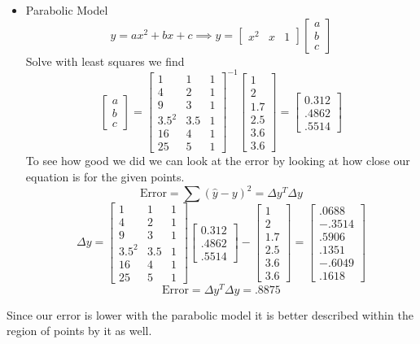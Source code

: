 \documentclass{article}
\begin{document}
\begin{itemize}
\item Parabolic Model
\newline
$$y = ax^2+bx+c \implies y = \begin{bmatrix}x^2 & x & 1 \end{bmatrix} \begin{bmatrix} a \\ b \\ c \end{bmatrix} $$
Solve with least squares we find
$$
\begin{bmatrix} a \\ b \\ c\end{bmatrix}
=
\begin{bmatrix}
1  & 1 &  1 \\
4  & 2 &  1 \\
9  & 3 &  1 \\
3.5^2& 3.5& 1 \\
16 & 4 &  1 \\
25 & 5 &  1
\end{bmatrix}
^{-1}
\begin{bmatrix}
1 \\
2 \\
1.7\\
2.5\\
3.6\\
3.6
\end{bmatrix}
=
\begin{bmatrix} 0.312 \\ .4862 \\ .5514 \end{bmatrix}
$$
To see how good we did we can look at the error by looking at how close our equation is for the given points.
$$
\text{Error} = \sum{(\hat{y} - y)^2} = \Delta{y}^T\Delta{y}
$$
$$
\Delta{y} =
\begin{bmatrix}
1  & 1 &  1 \\
4  & 2 &  1 \\
9  & 3 &  1 \\
3.5^2& 3.5& 1 \\
16 & 4 &  1 \\
25 & 5 &  1
\end{bmatrix}
\begin{bmatrix} 0.312 \\ .4862 \\ .5514 \end{bmatrix}
-
\begin{bmatrix}
1 \\
2 \\
1.7\\
2.5\\
3.6\\
3.6
\end{bmatrix}
=
\begin{bmatrix}
.0688\\
-.3514 \\
.5906\\
.1351\\
-.6049\\
.1618
\end{bmatrix}
$$
$$ \text{Error} = \Delta{y}^T\Delta{y}= .8875 $$
\end{itemize}
Since our error is lower with the parabolic model it is better described within the region of points by it as well.
\end{document}
